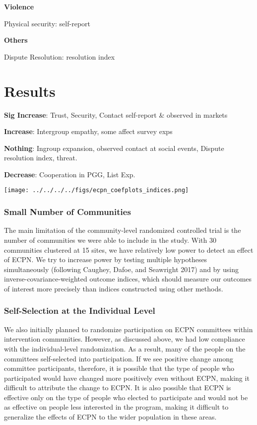 \documentclass[11pt]{article}
\begin{document}
\textbf{Violence}

Physical security: self-report

\textbf{Others}

Dispute Resolution: resolution index

\hypertarget{results}{%
\section{Results}\label{results}}

\textbf{Sig Increase}: Trust, Security, Contact self-report \& observed
in markets

\textbf{Increase}: Intergroup empathy, some affect survey exps

\textbf{Nothing}: Ingroup expansion, observed contact at social events,
Dispute resolution index, threat.

\textbf{Decrease}: Cooperation in PGG, List Exp.

\texttt{[image: ../../../../figs/ecpn\_coefplots\_indices.png]}

\hypertarget{small-number-of-communities}{%
\subsubsection{Small Number of
Communities}\label{small-number-of-communities}}

The main limitation of the community-level randomized controlled trial
is the number of communities we were able to include in the study. With
30 communities clustered at 15 sites, we have relatively low power to
detect an effect of ECPN. We try to increase power by testing multiple
hypotheses simultaneously (following Caughey, Dafoe, and Seawright 2017)
and by using inverse-covariance-weighted outcome indices, which should
measure our outcomes of interest more precisely than indices constructed
using other methods.

\hypertarget{self-selection-at-the-individual-level}{%
\subsubsection{Self-Selection at the Individual
Level}\label{self-selection-at-the-individual-level}}

We also initially planned to randomize participation on ECPN committees
within intervention communities. However, as discussed above, we had low
compliance with the individual-level randomization. As a result, many of
the people on the committees self-selected into participation. If we see
positive change among committee participants, therefore, it is possible
that the type of people who participated would have changed more
positively even without ECPN, making it difficult to attribute the
change to ECPN. It is also possible that ECPN is effective only on the
type of people who elected to participate and would not be as effective
on people less interested in the program, making it difficult to
generalize the effects of ECPN to the wider population in these areas.
\end{document}
